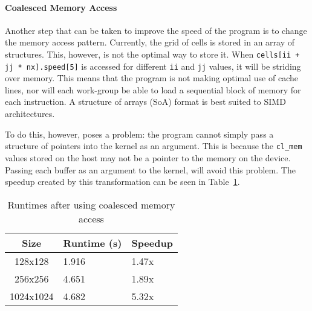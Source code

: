 

\paragraph{Coalesced Memory Access}
Another step that can be taken to improve the speed of the program is to change the memory access pattern. Currently, the grid of cells is stored in an array of structures. This, however, is not the optimal way to store it. When \texttt{cells[ii + jj * nx].speed[5]} is accessed for different \texttt{ii} and \texttt{jj} values, it will be striding over memory. This means that the program is not making optimal use of cache lines, nor will each work-group be able to load a sequential block of memory for each instruction. A structure of arrays (SoA) format is best suited to SIMD architectures.

To do this, however, poses a problem: the program cannot simply pass a structure of pointers into the kernel as an argument. This is because the \texttt{cl\_mem} values stored on the host may not be a pointer to the memory on the device. Passing each buffer as an argument to the kernel, will avoid this problem. The speedup created by this transformation can be seen in Table~\ref{table:coalesced-access}.

\begin{table}[ht]
\vspace{-5mm}
\centering
\caption{Runtimes after using coalesced memory access}
\vspace{1mm}
\begin{tabular}{|c||p{5.8em}|p{4.8em}|}
    \hline
    Size & Runtime (s) & Speedup \\
    \hline
    128x128 & 1.916 & 1.47x \\
    \hline
    256x256 & 4.651 & 1.89x \\
    \hline
    1024x1024 & 4.682 & 5.32x \\
    \hline
\end{tabular}
\label{table:coalesced-access}
\vspace{-7mm}
\end{table}

